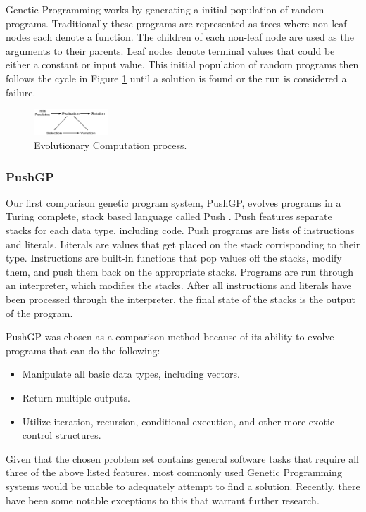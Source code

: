 Genetic Programming works by generating a initial population of random programs. Traditionally these programs are represented as trees where non-leaf nodes each denote a function. The children of each non-leaf node are used as the arguments to their parents. Leaf nodes denote terminal values that could be either a constant or input value. This initial population of random programs then follows the cycle in Figure \ref{fig:evo}  until a solution is found or the run is considered a failure.

\begin{figure}[t]
\centering
\includegraphics[width=0.25\textwidth]{res/EvolutionCycle}
\caption{Evolutionary Computation process.}
\label{fig:evo}
\end{figure}

\subsubsection{PushGP}

Our first comparison genetic program system, PushGP, evolves programs in a Turing complete, stack based language called Push \cite{Spector2002, Spector2005}. Push features separate stacks for each data type, including code. Push programs are lists of instructions and literals. Literals are values that get placed on the stack corrisponding to their type. Instructions are built-in functions that pop values off the stacks, modify them, and push them back on the appropriate stacks. Programs are run through an interpreter, which modifies the stacks. After all instructions and literals have been processed through the interpreter, the final state of the stacks is the output of the program.

PushGP was chosen as a comparison method because of its ability to evolve programs that can do the following:
\begin{itemize}
\item Manipulate all basic data types, including vectors.
\item Return multiple outputs.
\item Utilize iteration, recursion, conditional execution, and other more exotic control structures.
\end{itemize}

Given that the chosen problem set contains general software tasks that require all three of the above listed features, most commonly used Genetic Programming systems would be unable to adequately attempt to find a solution. Recently, there have been some notable exceptions to this that warrant further research.

